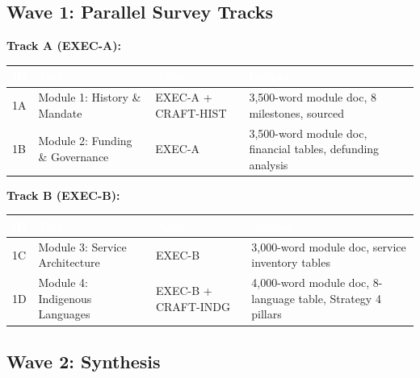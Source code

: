 \documentclass[11pt,letterpaper]{article}
\newcommand{\tableheader}[1]{\textbf{\sffamily\textcolor{white}{#1}}}
\begin{document}
\subsection{Wave 1: Parallel Survey Tracks}

\textbf{Track A (EXEC-A):}

\begin{center}
\begin{tabularx}{\textwidth}{C{0.7cm}L{3cm}C{1.5cm}X}
\toprule
{}
\tableheader{ID} & \tableheader{Task} & \tableheader{Agent} & \tableheader{Output} \\
\midrule
1A & Module 1: History \& Mandate & EXEC-A + CRAFT-HIST & 3,500-word module doc, 8 milestones, sourced \\
1B & Module 2: Funding \& Governance & EXEC-A & 3,500-word module doc, financial tables, defunding analysis \\
\bottomrule
\end{tabularx}
\end{center}

\textbf{Track B (EXEC-B):}

\begin{center}
\begin{tabularx}{\textwidth}{C{0.7cm}L{3cm}C{1.5cm}X}
\toprule
{}
\tableheader{ID} & \tableheader{Task} & \tableheader{Agent} & \tableheader{Output} \\
\midrule
1C & Module 3: Service Architecture & EXEC-B & 3,000-word module doc, service inventory tables \\
1D & Module 4: Indigenous Languages & EXEC-B + CRAFT-INDG & 4,000-word module doc, 8-language table, Strategy 4 pillars \\
\bottomrule
\end{tabularx}
\end{center}

\subsection{Wave 2: Synthesis}
\end{document}
